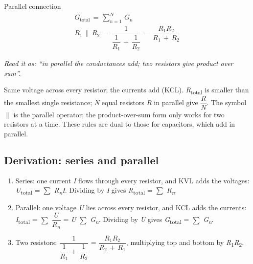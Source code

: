 \documentclass[11pt]{article}
\begin{document}
\begin{keepsection}
\begin{keepsection}
\begin{equationcard}{Parallel connection}
\[ \begin{gathered} {G}_{\text{total}}\, =\, \sum_{{n}=1}^{{N}} \, {G}_{{n}} \\ {R}_{1}\, \parallel \, {R}_{2}\, =\, \dfrac{1}{\dfrac{1}{{R}_{1}}\, +\, \dfrac{1}{{R}_{2}}}\, =\, \dfrac{{R}_{1}{R}_{2}}{{R}_{1}\, +\, {R}_{2}} \end{gathered} \]
{\small \emph{Read it as: “in parallel the conductances add; two resistors give product over sum”.}\par Same voltage across every resistor; the currents add (KCL). \textit{R}\textsubscript{total} is smaller than the smallest single resistance; \textit{N} equal resistors \textit{R} in parallel give {\small\ensuremath{\dfrac{{R}}{{N}}}}. The symbol \ensuremath{\parallel} is the parallel operator; the product-over-sum form only works for two resistors at a time. These rules are dual to those for capacitors, which add in parallel.}
\end{equationcard}
\end{keepsection}

\begin{keepsection}
\subsection{Derivation: series and parallel}

\begin{enumerate}
\item Series: one current \textit{I} flows through every resistor, and KVL adds the voltages: \textit{U}\textsubscript{total} = \ensuremath{\textstyle\sum} \textit{R}\textsubscript{\textit{n}}\textit{I}. Dividing by \textit{I} gives \textit{R}\textsubscript{total} = \ensuremath{\textstyle\sum} \textit{R}\textsubscript{\textit{n}}.
\item Parallel: one voltage \textit{U} lies across every resistor, and KCL adds the currents: \textit{I}\textsubscript{total} = \ensuremath{\textstyle\sum} {\small\ensuremath{\dfrac{{U}}{{R}_{{n}}}}} = \textit{U} \ensuremath{\textstyle\sum} \textit{G}\textsubscript{\textit{n}}. Dividing by \textit{U} gives \textit{G}\textsubscript{total} = \ensuremath{\textstyle\sum} \textit{G}\textsubscript{\textit{n}}.
\item Two resistors: {\small\ensuremath{\dfrac{1}{\dfrac{1}{{R}_{1}}\, +\, \dfrac{1}{{R}_{2}}}}} = {\small\ensuremath{\dfrac{{R}_{1}{R}_{2}}{{R}_{2}\, +\, {R}_{1}}}}, multiplying top and bottom by \textit{R}\textsubscript{1}\textit{R}\textsubscript{2}.
\end{enumerate}


\end{keepsection}
\end{keepsection}
\end{document}
